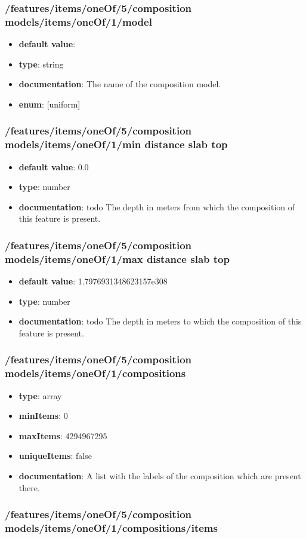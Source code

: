\subsubsection{/features/items/oneOf/5/composition models/items/oneOf/1/model}
\begin{itemize}\item {\bf default value}: 
\item {\bf type}: string
\item {\bf documentation}: The name of the composition model.
\item {\bf enum}: [uniform]\end{itemize}\subsubsection{/features/items/oneOf/5/composition models/items/oneOf/1/min distance slab top}
\begin{itemize}\item {\bf default value}: 0.0
\item {\bf type}: number
\item {\bf documentation}: todo The depth in meters from which the composition of this feature is present.
\end{itemize}\subsubsection{/features/items/oneOf/5/composition models/items/oneOf/1/max distance slab top}
\begin{itemize}\item {\bf default value}: 1.7976931348623157e308
\item {\bf type}: number
\item {\bf documentation}: todo The depth in meters to which the composition of this feature is present.
\end{itemize}\subsubsection{/features/items/oneOf/5/composition models/items/oneOf/1/compositions}
\begin{itemize}\item {\bf type}: array
\item {\bf minItems}: 0
\item {\bf maxItems}: 4294967295
\item {\bf uniqueItems}: false
\item {\bf documentation}: A list with the labels of the composition which are present there.
\end{itemize}\subsubsection{/features/items/oneOf/5/composition models/items/oneOf/1/compositions/items}
